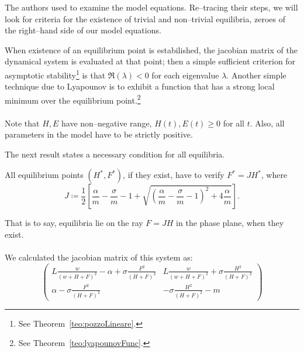 The authors used  to examine the model equations.
Re--tracing their steps, we will look for criteria for the existence of trivial and non--trivial equilibria, \ie zeroes of the right--hand side of our model equations.

When existence of an equilibrium point is estabilished, the jacobian matrix of the dynamical system is
evaluated at that point; then a simple sufficient criterion for asymptotic
stability\footnote{See Theorem~\ref{teo:pozzoLineare}.}
is that $\Re (\lambda) < 0$ for each eigenvalue $\lambda$.
Another simple technique due to Lyapounov is to exhibit a function that has a strong local minimum
over the equilibrium point.\footnote{See Theorem~\ref{teo:lyapounovFunc}.}

\paragraph{}
Note that $H, E$ have non--negative range, \ie $H(t), E(t) \geq 0$ for all $t$.
Also, all parameters in the model have to be strictly positive.

The next result states a necessary condition for all equilibria.

\begin{lemma}
    \label{lem:necessJ}
    All equilibrium points $(H^*, F^*)$, if they exist, have to verify $F^* = J H^*$, where
    \begin{equation}
        J \coloneq \frac{1}{2} \left[
            \frac{\alpha}{m} - \frac{\sigma}{m} - 1 +
            \sqrt{ {\left( \frac{\alpha}{m} - \frac{\sigma}{m} - 1 \right)}^2
                + 4 \frac{\alpha}{m}
            }
        \right].
        \label{eq:kh11posEqJ}
    \end{equation}
\end{lemma}

That is to say, equilibria lie on the ray $F= JH$ in the phase plane, when they exist.

\paragraph{}
We calculated the jacobian matrix of this system as:
\begin{equation}
    \begin{pmatrix}
        L \frac{w}{{(w + H + F)}^2} - \alpha + \sigma \frac{F^2}{{(H+F)}^2} &
        L \frac{w}{{(w + H + F)}^2} + \sigma \frac{H^2}{{(H+F)}^2}
        \\
        \alpha - \sigma \frac{F^2}{{(H+F)}^2} &
        - \sigma \frac{H^2}{{(H+F)}^2} - m
    \end{pmatrix}
    \label{eq:jacoGeneral}
\end{equation}

